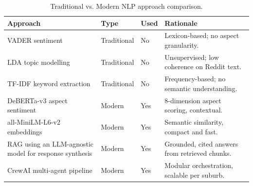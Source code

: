 \documentclass[11pt,a4paper]{article}
\begin{document}
\begin{table}[H]
\centering
\caption{Traditional vs. Modern NLP approach comparison.}
\label{tab:trad-vs-modern}
\begin{tabular}{|L{0.28\textwidth}|L{0.14\textwidth}|L{0.10\textwidth}|L{0.38\textwidth}|}
\hline
\textbf{Approach} & \textbf{Type} & \textbf{Used} & \textbf{Rationale} \\
\hline
VADER sentiment & Traditional & No & Lexicon-based; no aspect granularity. \\
\hline
LDA topic modelling & Traditional & No & Unsupervised; low coherence on Reddit text. \\
\hline
TF-IDF keyword extraction & Traditional & No & Frequency-based; no semantic understanding. \\
\hline
DeBERTa-v3 aspect sentiment & Modern & Yes & 8-dimension aspect scoring, contextual. \\
\hline
all-MiniLM-L6-v2 embeddings & Modern & Yes & Semantic similarity, compact and fast. \\
\hline
RAG using an LLM-agnostic model for response synthesis & Modern & Yes & Grounded, cited answers from retrieved chunks. \\
\hline
CrewAI multi-agent pipeline & Modern & Yes & Modular orchestration, scalable per suburb. \\
\hline
\end{tabular}
\end{table}
\end{document}

